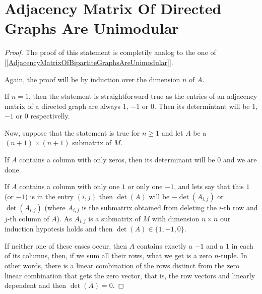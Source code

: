 ﻿\chapter{Adjacency Matrix Of Directed Graphs Are Unimodular}


\begin{proof}
    The proof of this statement is completily analog to the one of [\ref{AdjacencyMatrixOfBipartiteGraphsAreUnimodular}].\pn
    
    Again, the proof will be by induction over the dimension $n$ of $A$.\pn
    
    If $n=1$, then the statement is straightforward true as the entries of an adjacency matrix of a directed graph are always
    $1$, $-1$ or $0$. Then its determintant will be $1$, $-1$ or $0$ respectivelly.\pn
    
    Now, suppose that the statement is true for $n \geq 1$ and let $A$ be a $(n+1) \times (n+1)$ submatrix of $M$.\pn
    
    If $A$ contains a column with only zeros, then its determinant will be $0$ and we are done.\pn
    
    If $A$ contains a column with only one $1$ or only one $-1$, and lets say that this $1$ (or $-1$) is in the entry $(i,j)$
    then $\det(A)$ will be $-\det(A_{i,j})$ or $\det(A_{i,j})$ (where $A_{i,j}$ is the submatrix obtained from deleting the 
    $i$-th row and $j$-th column of $A$). As $A_{i,j}$ is a submatrix of $M$ with dimension $n \times n$ our induction hypotesis holds
    and then $\det(A) \in \{1, -1, 0\}$.\pn
    
    If neither one of these cases occur, then $A$ contains exactly a $-1$ and a $1$ in each of its columns, then, if we
    sum all their rows, what we get is a zero $n$-tuple. In other words, there is a linear combination of the rows distinct from the
    zero linear combination that gets the zero vector, that is, the row vectors and linearly dependent and then $\det(A) = 0$.
\end{proof}